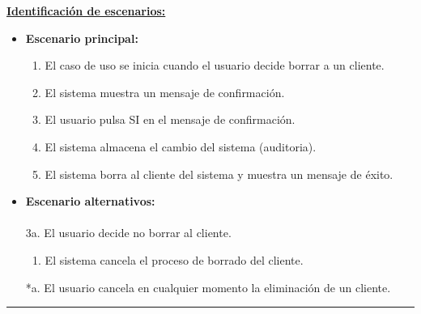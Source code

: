 \underline{\textbf{Identificación de escenarios:}}
\begin{itemize}\renewcommand{\labelitemi}{$\circ$}
 \item \textbf{Escenario principal:}
         \begin{enumerate}
          \item El caso de uso se inicia cuando el usuario decide borrar a un cliente.
          \item El sistema muestra un mensaje de confirmación.
          \item El usuario pulsa SI en el mensaje de confirmación.
 	  \item El sistema almacena el cambio del sistema (auditoria).
	  \item El sistema borra al cliente del sistema y muestra un mensaje de éxito.
         \end{enumerate}
  \item \textbf{Escenario alternativos:}\\\\
           3a. El usuario decide no borrar al cliente.
		\begin{enumerate}
		 \item El sistema cancela el proceso de borrado del cliente.
		\end{enumerate}
          *a. El usuario cancela en cualquier momento la eliminación de un cliente.
\end{itemize}

\smallskip
\hrule height 1pt
\smallskip

